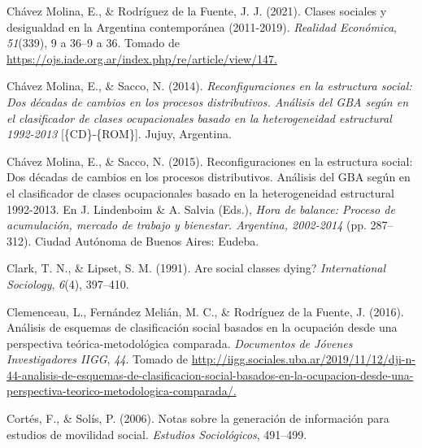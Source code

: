 \documentclass[
]{article}
\newlength{\cslhangindent}
\newlength{\cslentryspacingunit} %
\newenvironment{CSLReferences}[2] %
 {%
  \setlength{\parindent}{0pt}
  \ifodd #1
  \let\oldpar\par
  \def\par{\hangindent=\cslhangindent\oldpar}
  \fi
  \setlength{\parskip}{#2\cslentryspacingunit}
 }%
 {}
\begin{document}
\begin{CSLReferences}{1}{0}
\leavevmode{}%
Chávez Molina, E., \& Rodríguez de la Fuente, J. J. (2021). Clases sociales y desigualdad en la {Argentina} contemporánea (2011-2019). \emph{Realidad Económica}, \emph{51}(339), 9 a 36--9 a 36. Tomado de \href{https://ojs.iade.org.ar/index.php/re/article/view/147}{https://ojs.iade.org.ar/index.php/re/article/view/147.}

\leavevmode{}%
Chávez Molina, E., \& Sacco, N. (2014). \emph{Reconfiguraciones en la estructura social: Dos décadas de cambios en los procesos distributivos. {Análisis} del {GBA} según en el clasificador de clases ocupacionales basado en la heterogeneidad estructural 1992-2013} {[}\{CD\}-\{ROM\}{]}. Jujuy, Argentina.

\leavevmode{}%
Chávez Molina, E., \& Sacco, N. (2015). Reconfiguraciones en la estructura social: Dos décadas de cambios en los procesos distributivos. {Análisis} del {GBA} según en el clasificador de clases ocupacionales basado en la heterogeneidad estructural 1992-2013. En J. Lindenboim \& A. Salvia (Eds.), \emph{Hora de balance: Proceso de acumulación, mercado de trabajo y bienestar. {Argentina}, 2002-2014} (pp. 287--312). Ciudad Autónoma de Buenos Aires: Eudeba.

\leavevmode{}%
Clark, T. N., \& Lipset, S. M. (1991). Are social classes dying? \emph{International Sociology}, \emph{6}(4), 397--410.

\leavevmode{}%
Clemenceau, L., Fernández Melián, M. C., \& Rodríguez de la Fuente, J. (2016). Análisis de esquemas de clasificación social basados en la ocupación desde una perspectiva teórica-metodológica comparada. \emph{Documentos de Jóvenes Investigadores IIGG}, \emph{44}. Tomado de \href{http://iigg.sociales.uba.ar/2019/11/12/dji-n-44-analisis-de-esquemas-de-clasificacion-social-basados-en-la-ocupacion-desde-una-perspectiva-teorico-metodologica-comparada/}{http://iigg.sociales.uba.ar/2019/11/12/dji-n-44-analisis-de-esquemas-de-clasificacion-social-basados-en-la-ocupacion-desde-una-perspectiva-teorico-metodologica-comparada/.}

\leavevmode{}%
Cortés, F., \& Solís, P. (2006). Notas sobre la generación de información para estudios de movilidad social. \emph{Estudios Sociológicos}, 491--499.


\end{CSLReferences}
\end{document}
